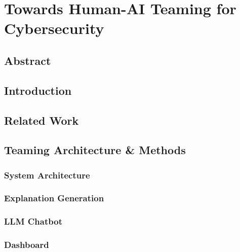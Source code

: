 

\chapter{Towards Human-AI Teaming for Cybersecurity} \label{CH2_HumanAI}

\graphicspath{{Papers/HumanAI/}}

\section*{Abstract}


\section{Introduction}


\section{Related Work}


\section{Teaming Architecture \& Methods}


\subsection{System Architecture}


\subsection{Explanation Generation}


\subsection{LLM Chatbot}


\subsection{Dashboard}


